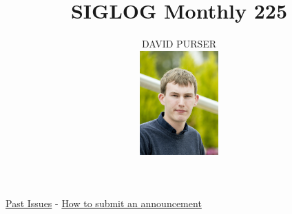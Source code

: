 \documentclass[prodmode,acmtecs]{acmsmall} %
\newcounter{colstart}
\begin{document}
\setcounter{colstart}{\thepage}

\title{\huge\sc SIGLOG Monthly 225}
\author{DAVID PURSER
\vspace*{-2.6cm}\begin{flushright}\includegraphics[width=30mm]{dp}\end{flushright}
}

\maketitlee

\href{https://lics.siglog.org/newsletters/}{Past Issues}
 - 
\href{https://lics.siglog.org/newsletters/inst.html}{How to submit an announcement}
\end{document}
